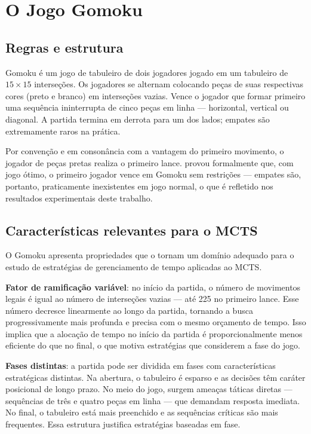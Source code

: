 \documentclass[cic,tc]{iiufrgs}
\begin{document}
\section{O Jogo Gomoku}
\label{sec:gomoku}

\subsection{Regras e estrutura}
\label{sec:gomoku_rules}

Gomoku é um jogo de tabuleiro de dois jogadores jogado em um tabuleiro de $15 \times 15$ interseções. Os jogadores se alternam colocando peças de suas respectivas cores (preto e branco) em interseções vazias. Vence o jogador que formar primeiro uma sequência ininterrupta de cinco peças em linha — horizontal, vertical ou diagonal. A partida termina em derrota para um dos lados; empates são extremamente raros na prática.

Por convenção e em consonância com a vantagem do primeiro movimento, o jogador de peças pretas realiza o primeiro lance. \citet{allis1994searching} provou formalmente que, com jogo ótimo, o primeiro jogador vence em Gomoku sem restrições — empates são, portanto, praticamente inexistentes em jogo normal, o que é refletido nos resultados experimentais deste trabalho.

\subsection{Características relevantes para o MCTS}
\label{sec:gomoku_mcts}

O Gomoku apresenta propriedades que o tornam um domínio adequado para o estudo de estratégias de gerenciamento de tempo aplicadas ao MCTS.

\textbf{Fator de ramificação variável}: no início da partida, o número de movimentos legais é igual ao número de interseções vazias — até 225 no primeiro lance. Esse número decresce linearmente ao longo da partida, tornando a busca progressivamente mais profunda e precisa com o mesmo orçamento de tempo. Isso implica que a alocação de tempo no início da partida é proporcionalmente menos eficiente do que no final, o que motiva estratégias que considerem a fase do jogo.

\textbf{Fases distintas}: a partida pode ser dividida em fases com características estratégicas distintas. Na abertura, o tabuleiro é esparso e as decisões têm caráter posicional de longo prazo. No meio do jogo, surgem ameaças táticas diretas — sequências de três e quatro peças em linha — que demandam resposta imediata. No final, o tabuleiro está mais preenchido e as sequências críticas são mais frequentes. Essa estrutura justifica estratégias baseadas em fase.
\end{document}
